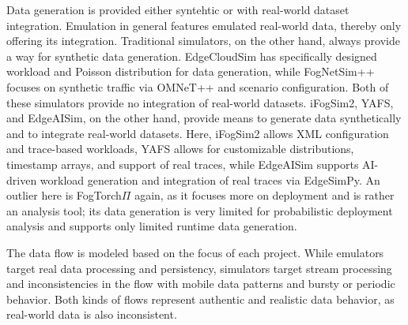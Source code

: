 Data generation is provided either syntehtic or with real-world dataset integration.
Emulation in general features emulated real-world data, thereby only offering its integration.
Traditional simulators, on the other hand, always provide a way for synthetic data generation.
EdgeCloudSim has specifically designed workload and Poisson distribution for data generation, while FogNetSim++ focuses on synthetic traffic via OMNeT++ and scenario configuration.
Both of these simulators provide no integration of real-world datasets.
iFogSim2, YAFS, and EdgeAISim, on the other hand, provide means to generate data synthetically and to integrate real-world datasets.
Here, iFogSim2 allows XML configuration and trace-based workloads, YAFS allows for customizable distributions, timestamp arrays, and support of real traces, while EdgeAISim supports AI-driven workload generation and integration of real traces via EdgeSimPy.
An outlier here is FogTorch$\Pi$ again, as it focuses more on deployment and is rather an analysis tool; its data generation is very limited for probabilistic deployment analysis and supports only limited runtime data generation.

The data flow is modeled based on the focus of each project. 
While emulators target real data processing and persistency, simulators target stream processing and inconsistencies in the flow with mobile data patterns and bursty or periodic behavior.
Both kinds of flows represent authentic and realistic data behavior, as real-world data is also inconsistent.

